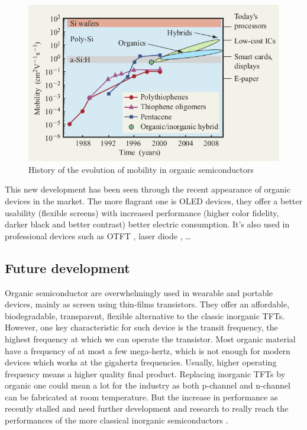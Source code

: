 \begin{figure}
    \centering
    \includegraphics[width=.6\paperwidth]{figures/evolution_perf.png}
    \caption{History of the evolution of mobility in organic semiconductors \label{fig:1}\cite{IBM}}
\end{figure}

This new development has been seen through the recent appearance of organic devices in the market. The more flagrant one is OLED devices, they offer a better usability (flexible screens) with increased performance (higher color fidelity, darker black and better contrast) better electric consumption. It's also used in professional devices such as OTFT \cite{OTFT}, laser diode \cite{laserDiode}, \dots

\subsection{Future development}

Organic semiconductor are overwhelmingly used in wearable and portable devices, mainly as screen using thin-films transistors. They offer an affordable, biodegradable, transparent, flexible alternative to the classic inorganic TFTs. However, one key characteristic for such device is the transit frequency, the highest frequency at which we can operate the transistor. Most organic material have a frequency of at most a few mega-hertz, which is not enough for modern devices which works at the gigahertz frequencies. Usually, higher operating frequency means a higher quality final product. Replacing inorganic TFTs by organic one could mean a lot for the industry as both p-channel and n-channel can be fabricated at room temperature. But the increase in performance as recently stalled and need further development and research to really reach the performances of the more classical inorganic semiconductors \cite{frequency}.

